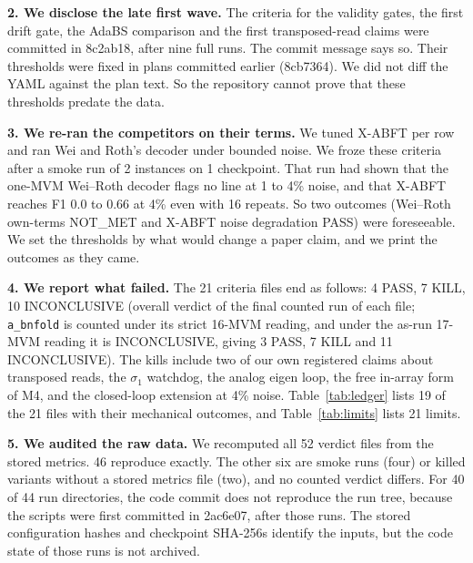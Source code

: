 \documentclass[journal]{IEEEtran}
\newcommand{\mfour}{\textsc{M4}}
\begin{document}
\textbf{2. We disclose the late first wave.} The criteria for the validity gates, the first drift gate, the AdaBS comparison and the first transposed-read claims were committed in 8c2ab18, after nine full runs. The commit message says so. Their thresholds were fixed in plans committed earlier (8cb7364). We did not diff the YAML against the plan text. So the repository cannot prove that these thresholds predate the data.

\textbf{3. We re-ran the competitors on their terms.} We tuned X-ABFT per row and ran Wei and Roth's decoder under bounded noise. We froze these criteria after a smoke run of 2 instances on 1 checkpoint. That run had shown that the one-MVM Wei--Roth decoder flags no line at 1 to 4\% noise, and that X-ABFT reaches F1 0.0 to 0.66 at 4\% even with 16 repeats. So two outcomes (Wei--Roth own-terms NOT\_MET and X-ABFT noise degradation PASS) were foreseeable. We set the thresholds by what would change a paper claim, and we print the outcomes as they came.

\textbf{4. We report what failed.} The 21 criteria files end as follows: 4 PASS, 7 KILL, 10 INCONCLUSIVE (overall verdict of the final counted run of each file; \texttt{a\_bnfold} is counted under its strict 16-MVM reading, and under the as-run 17-MVM reading it is INCONCLUSIVE, giving 3 PASS, 7 KILL and 11 INCONCLUSIVE).
The kills include two of our own registered claims about transposed reads, the $\sigma_1$ watchdog, the analog eigen loop, the free in-array form of \mfour{}, and the closed-loop extension at 4\% noise. Table~\ref{tab:ledger} lists 19 of the 21 files with their mechanical outcomes, and Table~\ref{tab:limits} lists 21 limits.

\textbf{5. We audited the raw data.} We recomputed all 52 verdict files from the stored metrics. 46 reproduce exactly. The other six are smoke runs (four) or killed variants without a stored metrics file (two), and no counted verdict differs. For 40 of 44 run directories, the code commit does not reproduce the run tree, because the scripts were first committed in 2ac6e07, after those runs. The stored configuration hashes and checkpoint SHA-256s identify the inputs, but the code state of those runs is not archived.
\end{document}
